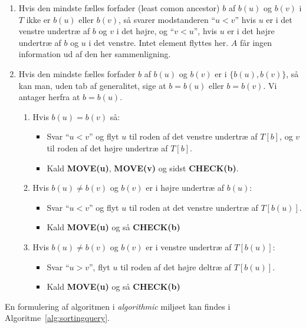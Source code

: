\begin{enumerate}
	\item Hvis den mindste fælles forfader (least comon ancestor) $b$ af $b(u)$ og $b(v)$ i $T$ ikke er $b(u)$ eller $b(v)$, så svarer modstanderen ``$u < v$'' hvis $u$ er i det venstre undertræ af $b$ og $v$ i det højre, og ``$v < u$'', hvis $u$ er i det højre undertræ af $b$ og $u$ i det venstre. Intet element flyttes her. $A$ får ingen information ud af den her sammenligning.
	\item Hvis den mindste fælles forfader $b$ af $b(u)$ og $b(v)$ er i $\{b(u), b(v)\}$, så kan man, uden tab af generalitet, sige at $b = b(u)$ eller $b = b(v)$. Vi antager herfra at $b = b(u)$.
	      \begin{enumerate}
		      \item Hvis $b(u) = b(v)$ så:
		            \begin{itemize}
			            \item Svar ``$u < v$'' og flyt $u$ til roden af det venstre undertræ af $T[b]$, og $v$ til roden af det højre undertræ af $T[b]$.
			            \item Kald \textbf{MOVE(u)}, \textbf{MOVE(v)} og sidst \textbf{CHECK(b)}.
		            \end{itemize}

		      \item Hvis $b(u) \ne b(v)$ og $b(v)$ er i højre undertræ af $b(u)$:
		            \begin{itemize}
			            \item Svar ``$u < v$'' og flyt $u$ til roden at det venstre undertræ af $T[b(u)]$.
			            \item Kald \textbf{MOVE(u)} og så \textbf{CHECK(b)}
		            \end{itemize}
		      \item Hvis $b(u) \ne b(v)$ og $b(v)$ er i venstre undertræ af $T[b(u)]$:
		            \begin{itemize}
			            \item Svar ``$u > v$'', flyt $u$ til roden af det højre deltræ af $T[b(u)]$.
			            \item Kald \textbf{MOVE(u)} og så \textbf{CHECK(b)}
		            \end{itemize}
	      \end{enumerate}
\end{enumerate}

En formulering af algoritmen i \textit{algorithmic} miljøet kan findes i Algoritme~\ref{alg:sortingquery}.

